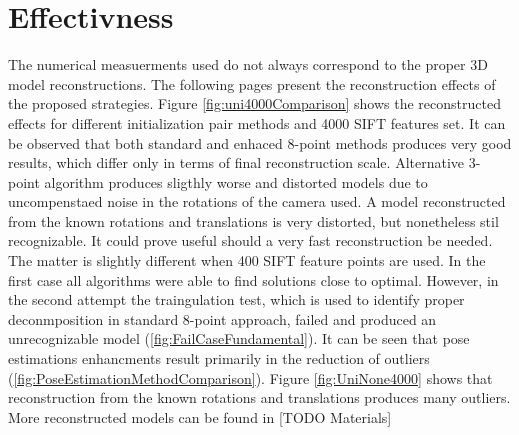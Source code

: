\section{Effectivness}
The numerical measuerments used do not always correspond to the proper 3D model reconstructions. The following pages present the reconstruction effects of the proposed strategies. Figure \ref{fig:uni4000Comparison} shows the reconstructed effects for different initialization pair methods and 4000 SIFT features set. It can be observed that both standard and enhaced 8-point methods produces very good results, which differ only in terms of final reconstruction scale. Alternative 3-point algorithm produces sligthly worse and distorted models due to uncompenstaed noise in the rotations of the camera used. A model reconstructed from the known rotations and translations is very distorted, but nonetheless stil recognizable. It could prove useful should a very fast reconstruction be needed.
\newline
The matter is slightly different when 400 SIFT feature points are used. In the first case all algorithms were able to find solutions close to optimal. However, in the second attempt the traingulation test, which is used to identify proper deconmposition in standard 8-point approach, failed and produced an unrecognizable model (\ref{fig:FailCaseFundamental}).
\newline
It can be seen that pose estimations enhancments result primarily in the reduction of outliers (\ref{fig:PoseEstimationMethodComparison}).
\newline
Figure \ref{fig:UniNone4000} shows that reconstruction from the known rotations and translations produces many outliers.
\newline
More reconstructed models can be found in [TODO Materials]

